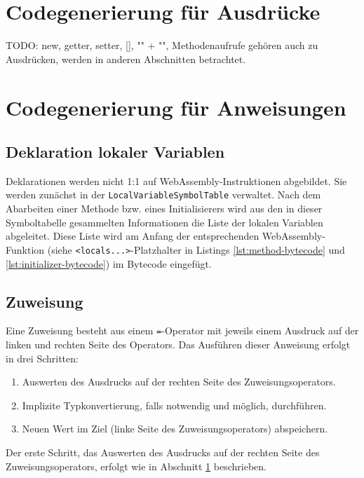 

\section{Codegenerierung für Ausdrücke}
\label{sec:Codegenerierung-für-Ausdrücke}

TODO: new, getter, setter, [], "" + "", Methodenaufrufe gehören auch zu Ausdrücken, werden in anderen Abschnitten betrachtet.

\section{Codegenerierung für Anweisungen}

\subsection{Deklaration lokaler Variablen}

Deklarationen werden nicht 1:1 auf WebAssembly-Instruktionen abgebildet. Sie werden zunächst in der \lstinline{LocalVariableSymbolTable} verwaltet. Nach dem Abarbeiten einer Methode bzw. eines Initialisierers wird aus den in dieser Symboltabelle gesammelten Informationen die Liste der lokalen Variablen abgeleitet. Diese Liste wird am Anfang der entsprechenden WebAssembly-Funktion (siehe \lstinline{<locals...>}-Platzhalter in Listings \ref{lst:method-bytecode} und \ref{lst:initializer-bytecode}) im Bytecode eingefügt.

\subsection{Zuweisung}
Eine Zuweisung besteht aus einem \lstinline{=}-Operator mit jeweils einem Ausdruck auf der linken und rechten Seite des Operators. Das Ausführen dieser Anweisung erfolgt in drei Schritten:
\begin{enumerate}
    \item Auswerten des Ausdrucks auf der rechten Seite des Zuweisungsoperators.
    \item Implizite Typkonvertierung, falls notwendig und möglich, durchführen.
    \item Neuen Wert im Ziel (linke Seite des Zuweisungsoperators) abspeichern.
\end{enumerate}

Der erste Schritt, das Auswerten des Ausdrucks auf der rechten Seite des Zuweisungsoperators, erfolgt wie in Abschnitt \ref{sec:Codegenerierung-für-Ausdrücke} beschrieben.

